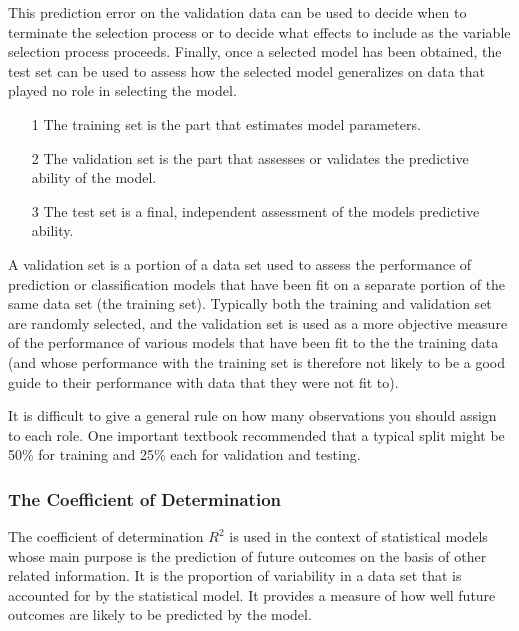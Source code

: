 \begin{frame}
This prediction error on the validation data can be used to decide when to terminate the selection process or to decide what effects to include as the variable selection process proceeds. Finally, once a selected model has been obtained, the test set can be used to assess how the selected model generalizes on data that played no role in selecting the model.

\begin{itemize}
\item[1] The training set is the part that estimates model parameters.
\item[2] The validation set is the part that assesses or validates the predictive ability of the model.
\item[3] The test set is a final, independent assessment of the models predictive ability.
\end{itemize}
\end{frame}
\begin{frame}
A validation set is a portion of a data set used to assess the performance of prediction or classification models that have been fit on a separate portion of the same data set (the training set). Typically both the training and validation set are randomly selected, and the validation set is used as a more objective measure of the performance of various models that have been fit to the the training data (and whose performance with the training set is therefore not
likely to be a good guide to their performance with data that they were not fit to).

It is difficult to give a general rule on how many observations you should assign to each role. One important textbook recommended that a typical split might be 50\% for training and 25\% each for validation and testing.


\end{frame}
\begin{frame}
\frametitle{The Coefficient of Determination}

The coefficient of determination $R^2$ is used in the context of statistical models whose main purpose is the prediction of future outcomes on the basis of other related information. It is the proportion of variability in a data set that is accounted for by the statistical model. It provides a measure of how well future outcomes are likely to be predicted by the model.
\end{frame}
